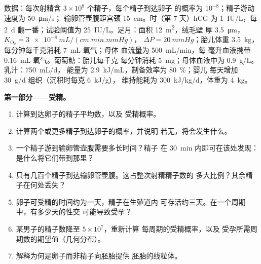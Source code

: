 \begin{problem}
\label{pb:b2:mammal-reproduction:1}
数据：每次射精含 $3\times 10^{8}$ 个精子，每个精子到达卵子
的概率为 $10^{-8}$；精子游动速度为 \qty{50}{\micro m/s}；
输卵管壶腹距宫颈 \qty{15}{cm}。时（第 7 天）hCG 为
\qty{1}{IU/L}，每 \qty{2}{d} 翻一番；试验阈值为
\qty{25}{IU/L}。足月：面积 \qty{12}{m^2}，绒毛壁
厚 \qty{3.5}{\micro m}，$K_{\mathrm{O_2}} = \qty{3e-8}{mL/(cm.min.mmHg)}$，
$\Delta P = \qty{20}{mmHg}$；胎儿体重 \qty{3.5}{kg}，每分钟每千克消耗
\qty{7}{mL} 氧气；母体
血流量为 \qty{500}{mL/min}，每
毫升血液携带 \qty{0.16}{mL} 氧气。葡萄糖：胎儿每千克
每分钟消耗 \qty{5}{mg}；母体血液中为 \qty{0.9}{g/L}。乳汁：\qty{750}{mL/d}，
能量为 \qty{2.9}{kJ/mL}，制备效率为 \qty{80}{\%}；婴儿
每天增加 \qty{30}{g/d} 组织（沉积时每克 \qty{6}{kJ/g}），
维持能耗为 \qty{300}{kJ/kg/d}，体重为 \qty{4}{kg}。

\medskip
\noindent\textbf{第一部分——受精。}
\begin{enumerate}
  \item 计算到达卵子的精子平均数，以及
        受精概率。
  \item 计算两个或更多精子到达卵子的概率，并说明
        若无，将会发生什么。
  \item 一个精子游到输卵管壶腹需要多长时间？精子
        在 \qty{30}{min} 内即可在该处发现：是什么将它们带到那里？
  \item 只有几百个精子到达输卵管壶腹。这占整次射精精子数的
        多大比例？其余精子在何处丢失？
  \item 卵子可受精的时间约为一天，精子在生殖道内
        可存活约三天。在一个周期中，有多少天的性交
        可能导致受孕？
  \item 某男子的精子数降至 $5\times 10^{7}$，重新计算
        每周期的受精概率，以及
        受孕所需周期数的期望值（几何分布）。
  \item 解释为何是卵子而非精子向胚胎提供
        胚胎的线粒体。
\end{enumerate}


\end{problem}
